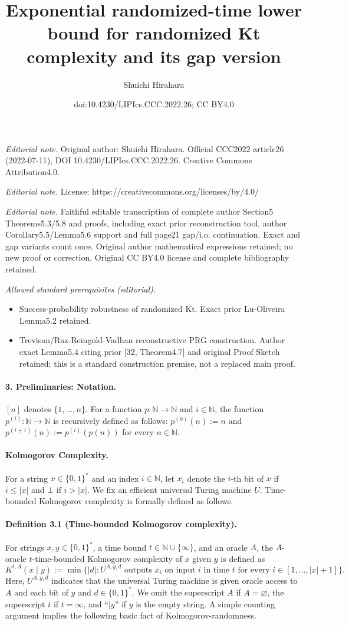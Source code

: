 \documentclass[10pt,a4paper]{article}
\title{Exponential randomized-time lower bound for randomized Kt complexity and its gap version}
\author{Shuichi Hirahara}
\date{doi:10.4230/LIPIcs.CCC.2022.26; CC BY4.0}
\begin{document}
\maketitle
\noindent\textit{Editorial note.} Original author: Shuichi Hirahara. Official CCC2022 article26 (2022-07-11), DOI 10.4230/LIPIcs.CCC.2022.26. Creative Commons Attribution4.0.\par\medskip
\noindent\textit{Editorial note.} License: https://creativecommons.org/licenses/by/4.0/\par\medskip
\noindent\textit{Editorial note.} Faithful editable transcription of complete author Section5 Theorems5.3/5.8 and proofs, including exact prior reconstruction tool, author Corollary5.5/Lemma5.6 support and full page21 gap/i.o. continuation. Exact and gap variants count once. Original author mathematical expressions retained; no new proof or correction. Original CC BY4.0 license and complete bibliography retained.\par\medskip
\noindent\textit{Allowed standard prerequisites (editorial).}\begin{itemize}
\item Success-probability robustness of randomized Kt. Exact prior Lu-Oliveira Lemma5.2 retained.
\item Trevisan/Raz-Reingold-Vadhan reconstructive PRG construction. Author exact Lemma5.4 citing prior [32, Theorem4.7] and original Proof Sketch retained; this is a standard construction premise, not a replaced main proof.
\end{itemize}\medskip
\paragraph{3. Preliminaries: Notation.}
$[n]$ denotes $\{1,\ldots,n\}$. For a function $p:\mathbb N\to\mathbb N$ and $i\in\mathbb N$, the function $p^{(i)}:\mathbb N\to\mathbb N$ is recursively defined as follows: $p^{(0)}(n):=n$ and $p^{(i+1)}(n):=p^{(i)}(p(n))$ for every $n\in\mathbb N$.
\paragraph{Kolmogorov Complexity.}
For a string $x\in\{0,1\}^*$ and an index $i\in\mathbb N$, let $x_i$ denote the $i$-th bit of $x$ if $i\leq|x|$ and $\bot$ if $i>|x|$. We fix an efficient universal Turing machine $U$. Time-bounded Kolmogorov complexity is formally defined as follows.
\paragraph{Definition 3.1 (Time-bounded Kolmogorov complexity).}
For strings $x,y\in\{0,1\}^*$, a time bound $t\in\mathbb N\cup\{\infty\}$, and an oracle $A$, the $A$-oracle $t$-time-bounded Kolmogorov complexity of $x$ given $y$ is defined as
\[K^{t,A}(x\mid y):=\min\{|d|:U^{A,y,d}\text{ outputs }x_i\text{ on input }i\text{ in time }t\text{ for every }i\in[1,\ldots,|x|+1]\}.\]
Here, $U^{A,y,d}$ indicates that the universal Turing machine is given oracle access to $A$ and each bit of $y$ and $d\in\{0,1\}^*$. We omit the superscript $A$ if $A=\varnothing$, the superscript $t$ if $t=\infty$, and ``$\mid y$'' if $y$ is the empty string.
A simple counting argument implies the following basic fact of Kolmogorov-randomness.
\end{document}
